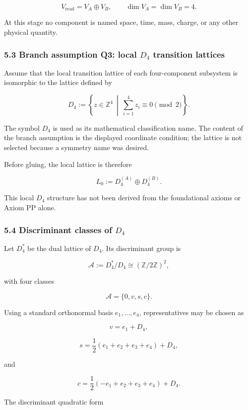\documentclass[
  a4paper,
]{article}
\begin{document}
\[
V_{\mathrm{read}}
=
V_A\oplus V_B,
\qquad
\dim V_A
=
\dim V_B
=4.
\]

At this stage no component is named space, time, mass, charge, or any
other physical quantity.

\subsubsection{\texorpdfstring{5.3 Branch assumption Q3: local \(D_4\)
transition
lattices}{5.3 Branch assumption Q3: local D\_4 transition lattices}}\label{branch-assumption-q3-local-d_4-transition-lattices}

Assume that the local transition lattice of each four-component
subsystem is isomorphic to the lattice defined by

\[
D_4
:=
\left\{
z\in\mathbb Z^4
\ \middle|\
\sum_{i=1}^{4}z_i
\equiv0
\pmod2
\right\}.
\]

The symbol \(D_4\) is used as its mathematical classification name. The
content of the branch assumption is the displayed coordinate condition;
the lattice is not selected because a symmetry name was desired.

Before gluing, the local lattice is therefore

\[
L_0
:=
D_4^{(A)}
\oplus
D_4^{(B)}.
\]

This local \(D_4\) structure has not been derived from the foundational
axioms or Axiom PP alone.

\subsubsection{\texorpdfstring{5.4 Discriminant classes of
\(D_4\)}{5.4 Discriminant classes of D\_4}}\label{discriminant-classes-of-d_4}

Let \(D_4^*\) be the dual lattice of \(D_4\). Its discriminant group is

\[
\mathcal A
:=
D_4^*/D_4
\cong
(\mathbb Z/2\mathbb Z)^2,
\]

with four classes

\[
\mathcal A
=
\{0,v,s,c\}.
\]

Using a standard orthonormal basis \(e_1,\ldots,e_4\), representatives
may be chosen as

\[
v=e_1+D_4,
\]

\[
s=
\frac12
(e_1+e_2+e_3+e_4)
+D_4,
\]

and

\[
c=
\frac12
(-e_1+e_2+e_3+e_4)
+D_4.
\]

The discriminant quadratic form
\end{document}
